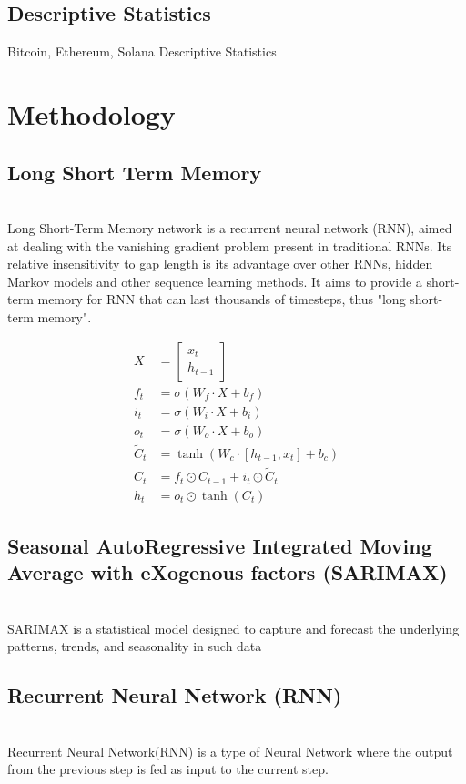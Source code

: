 \documentclass{ieeeojies}
\begin{document}
\subsection{Descriptive Statistics}
\begin{table}[H]
\caption{Bitcoin, Ethereum, Solana Descriptive Statistics}
\end{table}
\section{Methodology}
\subsection{Long Short Term Memory}\\
Long Short-Term Memory network is a recurrent neural network (RNN), aimed at dealing with the vanishing gradient problem present in traditional RNNs. Its relative insensitivity to gap length is its advantage over other RNNs, hidden Markov models and other sequence learning methods. It aims to provide a short-term memory for RNN that can last thousands of timesteps, thus "long short-term memory".

\begin{align*}
X &= \begin{bmatrix}
    x_t \\
    h_{t-1}
\end{bmatrix} \\
f_t &= \sigma(W_f \cdot X + b_f) \\
i_t &= \sigma(W_i \cdot X + b_i) \\
o_t &= \sigma(W_o \cdot X + b_o) \\
\tilde{C}_t &= \tanh(W_c \cdot [h_{t-1}, x_t] + b_c) \\
C_t &= f_t \odot C_{t-1} + i_t \odot \tilde{C}_t \\
h_t &= o_t \odot \tanh(C_t)
\end{align*}
\subsection{Seasonal AutoRegressive Integrated Moving Average with eXogenous
factors (SARIMAX)}\\
SARIMAX is a statistical model designed to capture and forecast the underlying patterns, trends, and seasonality in such data
\subsection{Recurrent Neural Network (RNN)}\\
Recurrent Neural Network(RNN) is a type of Neural Network where the output from the previous step is fed as input to the current step.
\end{document}
